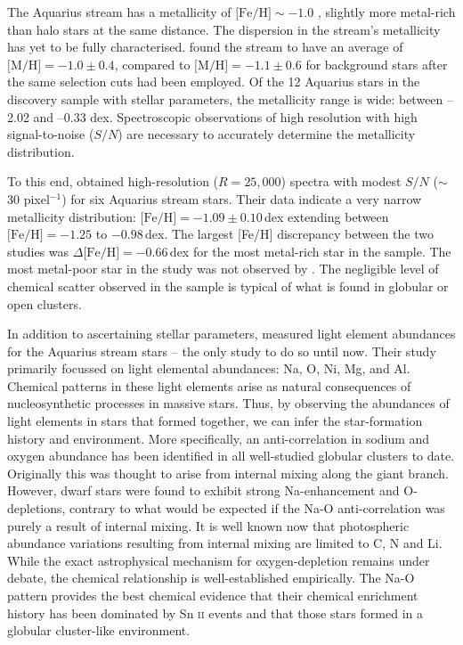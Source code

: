 \documentclass{emulateapj}
\begin{document}
The Aquarius stream has a metallicity of $\mbox{[Fe/H]} \sim -1.0$ \citep{williams;et-al_2011}, slightly more metal-rich than halo stars at the same distance. The dispersion in the stream's metallicity has yet to be fully characterised. \citet{williams;et-al_2011} found the stream to have an average of $\mbox{[M/H]} = -1.0 \pm 0.4$, compared to $\mbox{[M/H]} = -1.1 \pm 0.6$ for background stars after the same selection cuts had been employed. Of the 12 Aquarius stars in the \citet{williams;et-al_2011} discovery sample with stellar parameters, the metallicity range is wide: between --2.02 and --0.33 dex. Spectroscopic observations of high resolution with high signal-to-noise ($S/N$) are necessary to accurately determine the metallicity distribution.

To this end, \citet{wylie-de-boer;et-al_2012} obtained high-resolution ($R = 25,000$) spectra with modest $S/N$ ($\sim$30 pixel$^{-1}$) for six Aquarius stream stars. Their data indicate a very narrow metallicity distribution: $\mbox{[Fe/H]} = -1.09 \pm 0.10$\,dex extending between $\mbox{[Fe/H]} = -1.25$ to $-0.98$\,dex. The largest [Fe/H] discrepancy between the two studies was $\Delta\mbox{[Fe/H]} = -0.66$\,dex for the most metal-rich star in the \citet{williams;et-al_2011} sample. The most metal-poor star in the \citet{williams;et-al_2011} study was not observed by \citet{wylie-de-boer;et-al_2012}. The negligible level of chemical scatter observed in the \citet{wylie-de-boer;et-al_2012} sample is typical of what is found in globular or open clusters.

In addition to ascertaining stellar parameters, \citet{wylie-de-boer;et-al_2012} measured light element abundances for the Aquarius stream stars -- the only study to do so until now. Their study primarily focussed on light elemental abundances: Na, O, Ni, Mg, and Al. Chemical patterns in these light elements arise as natural consequences of nucleosynthetic processes in massive stars. Thus, by observing the abundances of light elements in stars that formed together, we can infer the star-formation history and environment. More specifically, an anti-correlation in sodium and oxygen abundance has been identified in all well-studied globular clusters to date. Originally this was thought to arise from internal mixing along the giant branch. However, dwarf stars were found to exhibit strong Na-enhancement and O-depletions, contrary to what would be expected if the Na-O anti-correlation was purely a result of internal mixing. It is well known now that photospheric abundance variations resulting from internal mixing are limited to C, N and Li. While the exact astrophysical mechanism for oxygen-depletion remains under debate, the chemical relationship is well-established empirically. The Na-O pattern provides the best chemical evidence that their chemical enrichment history has been dominated by Sn \textsc{ii} events and that those stars formed in a globular cluster-like environment.
\end{document}
